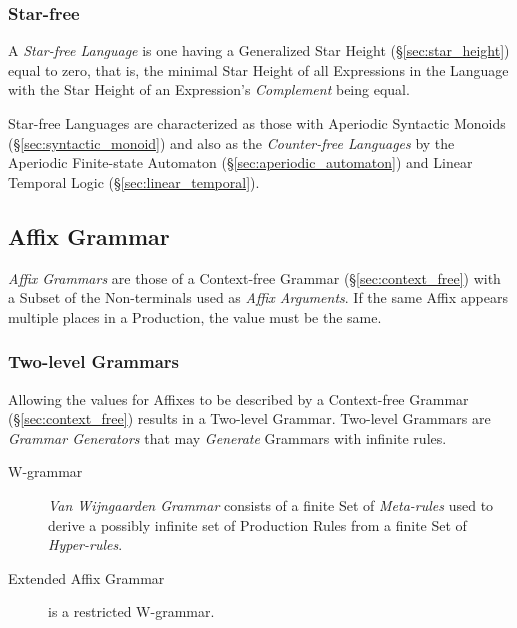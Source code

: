 \subsubsection{Star-free}\label{sec:starfree_grammar}

A \emph{Star-free Language} is one having a Generalized Star Height
(\S\ref{sec:star_height}) equal to zero, that is, the minimal Star
Height of all Expressions in the Language with the Star Height of an
Expression's \emph{Complement} being equal.

Star-free Languages are characterized as those with Aperiodic
Syntactic Monoids
(\S\ref{sec:syntactic_monoid})\cite{schutzenberger65} and also as the
\emph{Counter-free Languages}\cite{mcnaughton-papert71} by the
Aperiodic Finite-state Automaton (\S\ref{sec:aperiodic_automaton}) and
Linear Temporal Logic (\S\ref{sec:linear_temporal}).



\subsection{Affix Grammar}\label{sec:affix_grammar}

\emph{Affix Grammars} are those of a Context-free Grammar
(\S\ref{sec:context_free}) with a Subset of the Non-terminals used as
\emph{Affix Arguments}. If the same Affix appears multiple places in a
Production, the value must be the same.



\subsubsection{Two-level Grammars}\label{sec:two_level_grammar}

Allowing the values for Affixes to be described by a Context-free
Grammar (\S\ref{sec:context_free}) results in a Two-level Grammar.
Two-level Grammars are \emph{Grammar Generators} that may
\emph{Generate} Grammars with infinite rules.



\begin{description}
\item[W-grammar] \emph{Van Wijngaarden Grammar} consists of a finite
  Set of \emph{Meta-rules} used to derive a possibly infinite set of
  Production Rules from a finite Set of \emph{Hyper-rules}.
\item[Extended Affix Grammar] is a restricted W-grammar.
\end{description}



